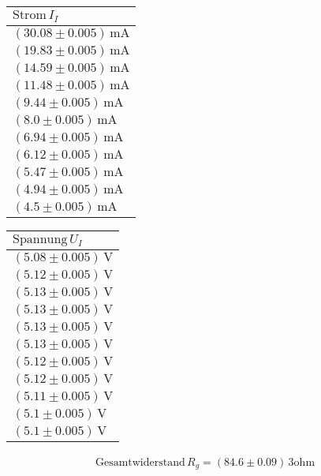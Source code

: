 \documentclass[a4paper,10pt]{scrbook}
\begin{document}
\begin{table}[htb]
\centering
\begin{tabular}{|l|}
\hline
$\text{Strom}\,I_I$  \\ \hline
$(30.08\pm 0.005)\,\mathrm{mA}$
\\ \hline
$(19.83\pm 0.005)\,\mathrm{mA}$
\\ \hline
$(14.59\pm 0.005)\,\mathrm{mA}$
\\ \hline
$(11.48\pm 0.005)\,\mathrm{mA}$
\\ \hline
$(9.44\pm 0.005)\,\mathrm{mA}$
\\ \hline
$(8.0\pm 0.005)\,\mathrm{mA}$
\\ \hline
$(6.94\pm 0.005)\,\mathrm{mA}$
\\ \hline
$(6.12\pm 0.005)\,\mathrm{mA}$
\\ \hline
$(5.47\pm 0.005)\,\mathrm{mA}$
\\ \hline
$(4.94\pm 0.005)\,\mathrm{mA}$
\\ \hline
$(4.5\pm 0.005)\,\mathrm{mA}$
\\ \hline
\end{tabular}
\end{table}
\begin{table}[htb]
\centering
\begin{tabular}{|l|}
\hline
$\text{Spannung}\,U_I$  \\ \hline
$(5.08\pm 0.005)\,\mathrm{V}$
\\ \hline
$(5.12\pm 0.005)\,\mathrm{V}$
\\ \hline
$(5.13\pm 0.005)\,\mathrm{V}$
\\ \hline
$(5.13\pm 0.005)\,\mathrm{V}$
\\ \hline
$(5.13\pm 0.005)\,\mathrm{V}$
\\ \hline
$(5.13\pm 0.005)\,\mathrm{V}$
\\ \hline
$(5.12\pm 0.005)\,\mathrm{V}$
\\ \hline
$(5.12\pm 0.005)\,\mathrm{V}$
\\ \hline
$(5.11\pm 0.005)\,\mathrm{V}$
\\ \hline
$(5.1\pm 0.005)\,\mathrm{V}$
\\ \hline
$(5.1\pm 0.005)\,\mathrm{V}$
\\ \hline
\end{tabular}
\end{table}
\begin{align*}
\text{Gesamtwiderstand}\,R_g = (84.6\pm 0.09)\,\mathrm{3 ohm}
\end{align*}
\end{document}

